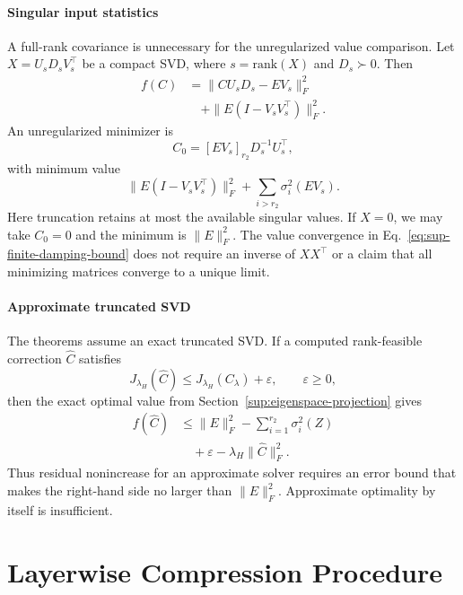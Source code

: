 \paragraph{Singular input statistics}
A full-rank covariance is unnecessary for the unregularized value comparison. Let $X=U_sD_sV_s^\top$ be a compact SVD, where $s=\mathrm{rank}(X)$ and $D_s\succ0$. Then
\begin{equation}
\begin{aligned}
f(C)
&=\|CU_sD_s-EV_s\|_F^2 \\
&\quad+\|E(I-V_sV_s^\top)\|_F^2.
\end{aligned}
\end{equation}
An unregularized minimizer is
\begin{equation}
C_0=[EV_s]_{r_2}D_s^{-1}U_s^\top,
\end{equation}
with minimum value
\begin{equation}
\|E(I-V_sV_s^\top)\|_F^2+\sum_{i>r_2}\sigma_i^2(EV_s).
\end{equation}
Here truncation retains at most the available singular values. If $X=0$, we may take $C_0=0$ and the minimum is $\|E\|_F^2$. The value convergence in Eq.~\eqref{eq:sup-finite-damping-bound} does not require an inverse of $XX^\top$ or a claim that all minimizing matrices converge to a unique limit.

\paragraph{Approximate truncated SVD}
The theorems assume an exact truncated SVD. If a computed rank-feasible correction $\widehat C$ satisfies
\begin{equation}
J_{\lambda_H}(\widehat C)
\le J_{\lambda_H}(C_\lambda)+\varepsilon,
\qquad\varepsilon\ge0,
\end{equation}
then the exact optimal value from Section~\ref{sup:eigenspace-projection} gives
\begin{equation}
\begin{aligned}
f(\widehat C)
&\le\|E\|_F^2-\sum_{i=1}^{r_2}\sigma_i^2(Z) \\
&\quad+\varepsilon-\lambda_H\|\widehat C\|_F^2.
\end{aligned}
\end{equation}
Thus residual nonincrease for an approximate solver requires an error bound that makes the right-hand side no larger than $\|E\|_F^2$. Approximate optimality by itself is insufficient.

\section{Layerwise Compression Procedure}\label{app:algorithms}

